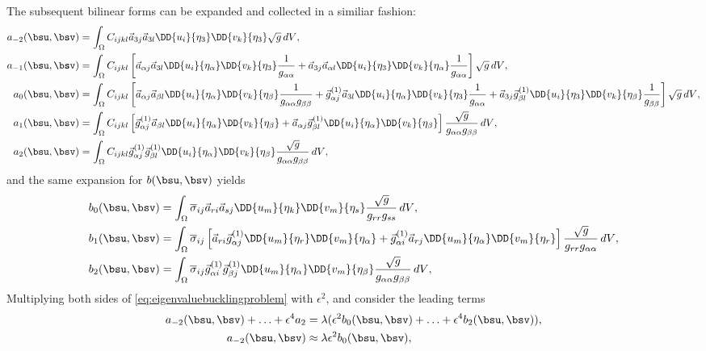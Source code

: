 The subsequent bilinear forms can be expanded and collected in a similiar fashion:
\begin{align*}
       a_{-2}(\bsu,\bsv) &= \int_{\Omega} C_{ijkl} \vec a_{3j}\vec a_{3l} \DD{u_i}{\eta_3} \DD{v_k}{\eta_3} \sqrt g \mathop{dV}, \\
         a_{-1}(\bsu,\bsv) &= \int_{\Omega} C_{ijkl} \left[ \vec a_{\alpha j}\vec a_{3l} \DD{u_i}{\eta_\alpha} \DD{v_k}{\eta_3} \frac1{g_{\alpha\alpha}} + \vec a_{3 j}\vec a_{\alpha l} \DD{u_i}{\eta_3} \DD{v_k}{\eta_\alpha} \frac1{g_{\alpha\alpha}} \right]\sqrt g \mathop{dV}, \\
           a_{0}(\bsu,\bsv) &= \int_{\Omega} C_{ijkl}  \left[ \vec a_{\alpha j}\vec a_{\beta l} \DD{u_i}{\eta_\alpha} \DD{v_k}{\eta_\beta } \frac1{g_{\alpha\alpha}g_{\beta\beta}} + \vec g^{(1)}_{\alpha j}\vec a_{3 l} \DD{u_i}{\eta_\alpha} \DD{v_k}{\eta_3} \frac1{g_{\alpha \alpha}} + \vec a_{3 j}\vec g^{(1)}_{\beta l} \DD{u_i}{\eta_3} \DD{v_k}{\eta_\beta } \frac1{g_{\beta\beta}}\right] \sqrt g \mathop{dV},\\
            a_{1}(\bsu,\bsv) &= \int_{\Omega} C_{ijkl} \left[ \vec g^{(1)}_{\alpha j}\vec a_{\beta l} \DD{u_i}{\eta_\alpha} \DD{v_k}{\eta_\beta}  + \vec a_{\alpha j}\vec g^{(1)}_{\beta l} \DD{u_i}{\eta_\alpha} \DD{v_k}{\eta_\beta}  \right] \frac{\sqrt g}{g_{\alpha\alpha}g_{\beta\beta}}\mathop{dV}, \\
            a_{2}(\bsu,\bsv) &= \int_{\Omega} C_{ijkl} \vec g^{(1)}_{\alpha j}\vec g^{(1)}_{\beta l} \DD{u_i}{\eta_\alpha} \DD{v_k}{\eta_\beta} \frac{\sqrt g}{g_{\alpha\alpha}g_{\beta\beta}}\mathop{dV},
    \end{align*}
    and the same expansion for $b(\bsu,\bsv)$ yields 
    \begin{align*}
        b_{0}(\bsu,\bsv) &=\int_{\Omega} \overline{\sigma}_{ij}\vec a_{ri}\vec a_{sj} \DD{u_m}{\eta_k} \DD{v_m}{\eta_s}\frac{\sqrt g}{g_{rr}g_{ss}}  \mathop{dV}   , \\ 
        b_{1}(\bsu,\bsv) &=\int_{\Omega} \overline{\sigma}_{ij}  \left[ \vec a_{r i}\vec g_{\alpha j}^{(1)} \DD{u_m}{\eta_r} \DD{v_m}{\eta_\alpha} +  \vec g_{\alpha i}^{(1)}\vec a_{r j} \DD{u_m}{\eta_\alpha} \DD{v_m}{\eta_r}\right] \frac{\sqrt g}{{g_{rr} g_{\alpha\alpha}} }\mathop{dV} , \\ 
        b_{2}(\bsu,\bsv) &=\int_{\Omega} \overline{\sigma}_{ij} \vec g_{\alpha i}^{(1)}\vec g_{\beta j}^{(1)} \DD{u_m}{\eta_\alpha} \DD{v_m}{\eta_\beta} \frac{\sqrt g}{g_{\alpha\alpha} g_{\beta\beta}} \mathop{dV} , \\ 
    \end{align*}
  Multiplying both sides of \eqref{eq:eigenvaluebucklingproblem} with $\epsilon^2$, and consider the leading terms
    \begin{align*}
       a_{-2}(\bsu,\bsv) + \ldots + \epsilon^4 a_2 &= \lambda( \epsilon^2 b_0(\bsu,\bsv) + \ldots + \epsilon^4 b_{2}(\bsu,\bsv)), \\
        a_{-2}(\bsu,\bsv) & \approx \lambda  \epsilon^2 b_0(\bsu,\bsv),
    \end{align*}
    